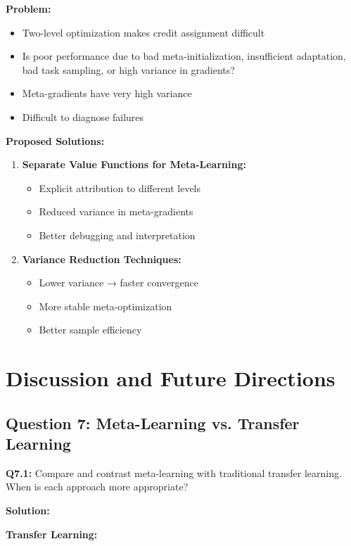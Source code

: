 \documentclass[12pt]{article}
\begin{document}
{{			\textbf{Problem:}
			\begin{itemize}
				\item Two-level optimization makes credit assignment difficult
				\item Is poor performance due to bad meta-initialization, insufficient adaptation, bad task sampling, or high variance in gradients?
				\item Meta-gradients have very high variance
				\item Difficult to diagnose failures
			\end{itemize}
			
			\textbf{Proposed Solutions:}
			\begin{enumerate}
				\item \textbf{Separate Value Functions for Meta-Learning:}
				\begin{itemize}
					\item Explicit attribution to different levels
					\item Reduced variance in meta-gradients
					\item Better debugging and interpretation
				\end{itemize}
				
				\item \textbf{Variance Reduction Techniques:}
				\begin{itemize}
					\item Lower variance → faster convergence
					\item More stable meta-optimization
					\item Better sample efficiency
				\end{itemize}
			\end{enumerate}
			
			\section{Discussion and Future Directions}
			
			\subsection{Question 7: Meta-Learning vs. Transfer Learning}
			
			\textbf{Q7.1:} Compare and contrast meta-learning with traditional transfer learning. When is each approach more appropriate?
			
			\textbf{Solution:}
			
			\textbf{Transfer Learning:}
			
}}
\end{document}
